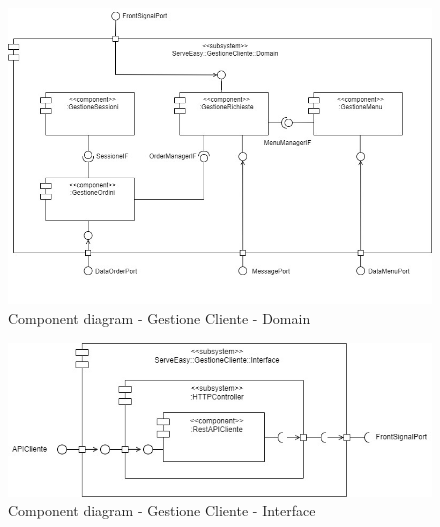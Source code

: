 \begin{figure}[htbp]
	\centering
	\includegraphics[scale=0.5]{iterazione1/images/GestioneCliente_subsystem-Domain.jpg}
	\caption{Component diagram - Gestione Cliente - Domain \label{fig:component_diagram_gestione_cliente_domain}}
\end{figure}

\begin{figure}[htbp]
	\centering
	\includegraphics[scale=0.5]{iterazione1/images/GestioneCliente_subsystem-Interface.jpg}
	\caption{Component diagram - Gestione Cliente - Interface \label{fig:component_diagram_gestione_cliente_interface}}
\end{figure}